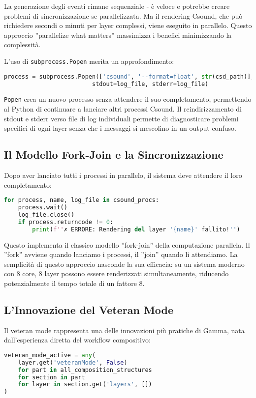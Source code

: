 La generazione degli eventi rimane sequenziale - è veloce e potrebbe creare problemi di sincronizzazione se parallelizzata. Ma il rendering Csound, che può richiedere secondi o minuti per layer complessi, viene eseguito in parallelo. Questo approccio ''parallelize what matters'' massimizza i benefici minimizzando la complessità.

L'uso di \texttt{subprocess.Popen} merita un approfondimento:

\begin{lstlisting}[language=Python]
process = subprocess.Popen(['csound', '--format=float', str(csd_path)], 
                         stdout=log_file, stderr=log_file)
\end{lstlisting}

\texttt{Popen} crea un nuovo processo senza attendere il suo completamento, permettendo al Python di continuare a lanciare altri processi Csound. Il reindirizzamento di stdout e stderr verso file di log individuali permette di diagnosticare problemi specifici di ogni layer senza che i messaggi si mescolino in un output confuso.
\subsection{Il Modello Fork-Join e la Sincronizzazione}
Dopo aver lanciato tutti i processi in parallelo, il sistema deve attendere il loro completamento:

\begin{lstlisting}[language=Python]
for process, name, log_file in csound_procs:
    process.wait()
    log_file.close()
    if process.returncode != 0:
        print(f''✗ ERRORE: Rendering del layer '{name}' fallito!'')
\end{lstlisting}

Questo implementa il classico modello ''fork-join'' della computazione parallela. Il ''fork'' avviene quando lanciamo i processi, il ''join'' quando li attendiamo. La semplicità di questo approccio nasconde la sua efficacia: su un sistema moderno con 8 core, 8 layer possono essere renderizzati simultaneamente, riducendo potenzialmente il tempo totale di un fattore 8.
\subsection{L'Innovazione del Veteran Mode}
Il veteran mode rappresenta una delle innovazioni più pratiche di Gamma, nata dall'esperienza diretta del workflow compositivo:

\begin{lstlisting}[language=Python]
veteran_mode_active = any(
    layer.get('veteranMode', False)
    for part in all_composition_structures
    for section in part
    for layer in section.get('layers', [])
)
\end{lstlisting}

